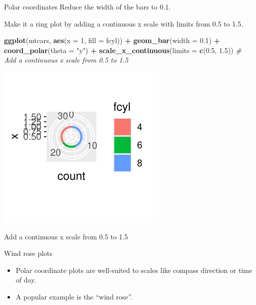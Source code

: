 \documentclass[
  ignorenonframetext,
]{beamer}
\newenvironment{Shaded}{\begin{snugshade}}{\end{snugshade}}
\newcommand{\AttributeTok}[1]{\textcolor[rgb]{0.13,0.29,0.53}{#1}}
\newcommand{\CommentTok}[1]{\textcolor[rgb]{0.56,0.35,0.01}{\textit{#1}}}
\newcommand{\DecValTok}[1]{\textcolor[rgb]{0.00,0.00,0.81}{#1}}
\newcommand{\FloatTok}[1]{\textcolor[rgb]{0.00,0.00,0.81}{#1}}
\newcommand{\FunctionTok}[1]{\textcolor[rgb]{0.13,0.29,0.53}{\textbf{#1}}}
\newcommand{\NormalTok}[1]{#1}
\newcommand{\SpecialCharTok}[1]{\textcolor[rgb]{0.81,0.36,0.00}{\textbf{#1}}}
\newcommand{\StringTok}[1]{\textcolor[rgb]{0.31,0.60,0.02}{#1}}
\begin{document}
\begin{frame}[fragile]{Polar coordinates}
\label{polar-coordinates-5}
Reduce the width of the bars to 0.1.

Make it a ring plot by adding a continuous x scale with limits from 0.5
to 1.5.


\begin{Shaded}
\begin{Highlighting}[]
\FunctionTok{ggplot}\NormalTok{(mtcars, }\FunctionTok{aes}\NormalTok{(}\AttributeTok{x =} \DecValTok{1}\NormalTok{, }\AttributeTok{fill =}\NormalTok{ fcyl)) }\SpecialCharTok{+} \FunctionTok{geom\_bar}\NormalTok{(}\AttributeTok{width =} \FloatTok{0.1}\NormalTok{) }\SpecialCharTok{+}
    \FunctionTok{coord\_polar}\NormalTok{(}\AttributeTok{theta =} \StringTok{"y"}\NormalTok{) }\SpecialCharTok{+} \FunctionTok{scale\_x\_continuous}\NormalTok{(}\AttributeTok{limits =} \FunctionTok{c}\NormalTok{(}\FloatTok{0.5}\NormalTok{,}
    \FloatTok{1.5}\NormalTok{))  }\CommentTok{\# Add a continuous x scale from 0.5 to 1.5}
\end{Highlighting}
\end{Shaded}

\begin{center}\includegraphics[width=0.5\linewidth]{Figs/unnamed-chunk-67-1} \end{center}

Add a continuous x scale from 0.5 to 1.5
\end{frame}

\begin{frame}{Wind rose plots}
\label{wind-rose-plots}
\begin{itemize}
\item
  Polar coordinate plots are well-suited to scales like compass
  direction or time of day.
\item
  A popular example is the ``wind rose''.
\end{itemize}
\end{frame}
\end{document}
